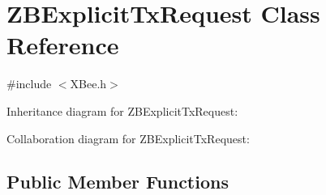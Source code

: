 \hypertarget{class_z_b_explicit_tx_request}{}\section{Z\+B\+Explicit\+Tx\+Request Class Reference}
\label{class_z_b_explicit_tx_request}


{\ttfamily \#include $<$X\+Bee.\+h$>$}



Inheritance diagram for Z\+B\+Explicit\+Tx\+Request\+:


Collaboration diagram for Z\+B\+Explicit\+Tx\+Request\+:
\subsection*{Public Member Functions}
